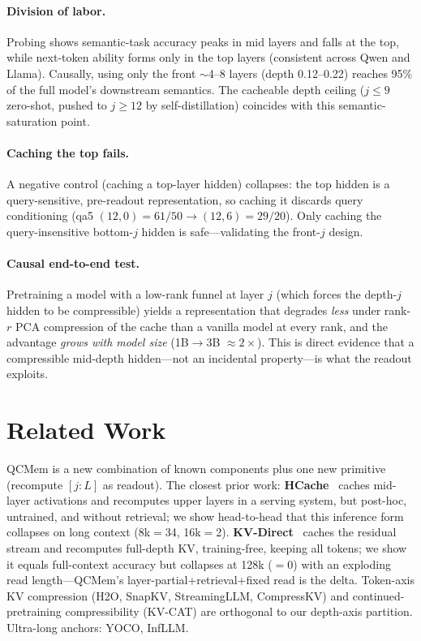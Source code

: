 \documentclass[11pt]{article}
\begin{document}
\paragraph{Division of labor.} Probing shows semantic-task accuracy peaks in
mid layers and falls at the top, while next-token ability forms only in the top
layers (consistent across Qwen and Llama). Causally, using only the front
$\sim$4--8 layers (depth 0.12--0.22) reaches 95\% of the full model's
downstream semantics. The cacheable depth ceiling ($j{\le}9$ zero-shot, pushed
to $j{\ge}12$ by self-distillation) coincides with this semantic-saturation
point.
\paragraph{Caching the top fails.} A negative control (caching a top-layer
hidden) collapses: the top hidden is a query-sensitive, pre-readout
representation, so caching it discards query conditioning
(qa5 $(12,0){=}61/50 \to (12,6){=}29/20$). Only caching the query-insensitive
bottom-$j$ hidden is safe---validating the front-$j$ design.
\paragraph{Causal end-to-end test.} Pretraining a model with a low-rank funnel
at layer $j$ (which forces the depth-$j$ hidden to be compressible) yields a
representation that degrades \emph{less} under rank-$r$ PCA compression of the
cache than a vanilla model at every rank, and the advantage \emph{grows with
model size} (1B$\to$3B $\approx 2\times$). This is direct evidence that a
compressible mid-depth hidden---not an incidental property---is what the
readout exploits.

\section{Related Work}
QCMem is a new combination of known components plus one new primitive
(recompute $[j{:}L]$ as readout). The closest prior work:
\textbf{HCache}~\citep{hcache} caches mid-layer activations and recomputes
upper layers in a serving system, but post-hoc, untrained, and without
retrieval; we show head-to-head that this inference form collapses on long
context (8k$=$34, 16k$=$2). \textbf{KV-Direct}~\citep{residualstream} caches
the residual stream and recomputes full-depth KV, training-free, keeping all
tokens; we show it equals full-context accuracy but collapses at 128k
($=0$) with an exploding read length---QCMem's layer-partial{+}retrieval{+}fixed
read is the delta. Token-axis KV compression (H2O, SnapKV, StreamingLLM,
CompressKV) and continued-pretraining compressibility (KV-CAT) are orthogonal
to our depth-axis partition. Ultra-long anchors: YOCO, InfLLM.
\end{document}
